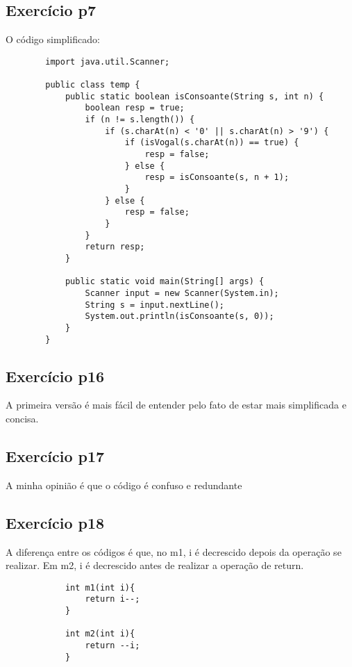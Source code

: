 \documentclass[12pt]{article}
\begin{document}
    \subsection{Exercício p7}
O código simplificado:
\begin{scriptsize}

    
    \begin{lstlisting}
        import java.util.Scanner;

        public class temp {
            public static boolean isConsoante(String s, int n) {
                boolean resp = true;
                if (n != s.length()) {
                    if (s.charAt(n) < '0' || s.charAt(n) > '9') {
                        if (isVogal(s.charAt(n)) == true) {
                            resp = false;
                        } else {
                            resp = isConsoante(s, n + 1);
                        }
                    } else {
                        resp = false;
                    }
                }
                return resp;
            }
        
            public static void main(String[] args) {
                Scanner input = new Scanner(System.in);
                String s = input.nextLine();
                System.out.println(isConsoante(s, 0));
            }
        }
    \end{lstlisting}
    \end{scriptsize}
    \subsection{Exercício p16}
    A primeira versão é mais fácil de entender pelo fato de estar mais simplificada e concisa.
    \subsection{Exercício p17}
    A minha opinião é que o código é confuso e redundante 
    \subsection{Exercício p18}
    A diferença entre os códigos é que, no m1, i é decrescido depois da operação se realizar. Em m2,
    i é decrescido antes de realizar a operação de return.
    \begin{scriptsize}
        
        \begin{lstlisting}
            int m1(int i){
                return i--;
            }
                
            int m2(int i){
                return --i;
            }
        \end{lstlisting}
        \end{scriptsize}
\end{document}
